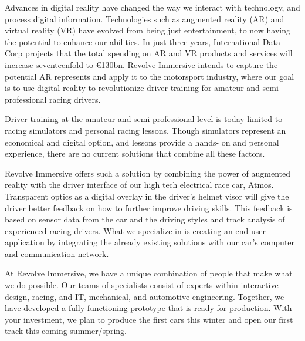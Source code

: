 \begin{newlfm}
\vspace{0cm}
Advances in digital reality have changed the way we interact with technology, and process digital information. Technologies such as augmented reality (AR) and virtual reality (VR) have evolved from being just entertainment, to now having the potential to enhance our abilities. In just three years, International Data Corp projects that the total spending on AR and VR products and services will increase seventeenfold to €130bn. Revolve Immersive intends to capture the potential AR represents and apply it to the motorsport industry, where our goal is to use digital reality to revolutionize driver training for amateur and semi-professional racing drivers. 

Driver training at the amateur and semi-professional level is today limited to racing simulators and personal racing lessons. Though simulators represent an economical and digital option, and lessons provide a hands- on and personal experience, there are no current solutions that combine all these factors.

Revolve Immersive offers such a solution by combining the power of augmented reality with the driver interface of our high tech electrical race car, Atmos. Transparent optics as a digital overlay in the driver’s helmet visor will give the driver better feedback on how to further improve driving skills. This feedback is based on sensor data from the car and the driving styles and track analysis of experienced racing drivers. What we specialize in is creating an end-user application by integrating the already existing solutions with our car’s computer and communication network. 

At Revolve Immersive, we have a unique combination of people that make what we do possible. Our teams of specialists consist of experts within interactive design, racing, and IT, mechanical, and automotive engineering. Together, we have developed a fully functioning prototype that is ready for production. With your investment, we plan to produce the first cars this winter and open our first track this coming summer/spring.


\end{newlfm}
